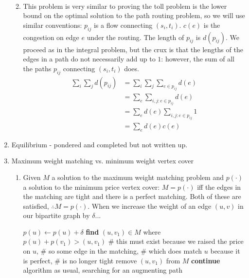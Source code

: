 \documentclass[a4paper]{article}
\begin{document}
\begin{enumerate}
\begin{enumerate}
\\
	\item This problem is very similar to proving the toll problem is the lower bound on the optimal solution to the path routing problem, so we will use similar conventions: $p_{ij}$ is a flow connecting $(s_i, t_i)$.  $c(e)$ is the congestion on edge $e$ under the routing.  The length of $p_{ij}$ is $d(p_{ij})$.  We proceed as in the integral problem, but the crux is that the lengths of the edges in a path do not necessarily add up to $1$: however, the sum of all the paths $p_{ij}$ connecting $(s_i, t_i)$ does.
		\begin{align*}
			\sum_{i}^{} \sum_{j}^{} d(p_{ij}) &= \sum_{i}^{} \sum_{j}^{} \sum_{e \in p_{ij}}^{} d(e) \\
			&= \sum_{e}^{} \sum_{i,j:e \in p_{ij}}^{} d(e) \\
			&= \sum_{e}^{} d(e) \sum_{i,j:e \in p_{ij}}^{} 1 \\
			&= \sum_{e}^{} d(e)c(e)
		\end{align*}
	\end{enumerate}
\item Equilibrium - pondered and completed but not written up.
\item Maximum weight matching vs. minimum weight vertex cover
	\begin{enumerate}
	\item Given $M$ a solution to the maximum weight matching problem and $p(\cdot)$ a solution to the minimum price vertex cover: $M=p(\cdot)$ iff the edges in the matching are tight and there is a perfect matching.  Both of these are satisfied, $\therefore M=p(\cdot)$.  When we increase the weight of an edge $(u,v)$ in our bipartite graph by $\delta$...
	\begin{algorithmic}
	\State $p(u) \gets p(u) + \delta$
		\Return
	\Else
		\State \textbf{find} $(u, v_1) \in M$ where $p(u) + p(v_1) > (u, v_1)$
		\State \# this must exist because we raised the price on $u$,
		\State \# so some edge in the matching,
		\State \# which does match $u$ because it is perfect,
		\State \# is no longer tight
		\State remove $(u, v_1)$ from $M$
		\State \textbf{continue} algorithm as usual, searching for an augmenting path
	\EndIf

\end{algorithmic}
\end{enumerate}
\end{enumerate}
\end{document}

